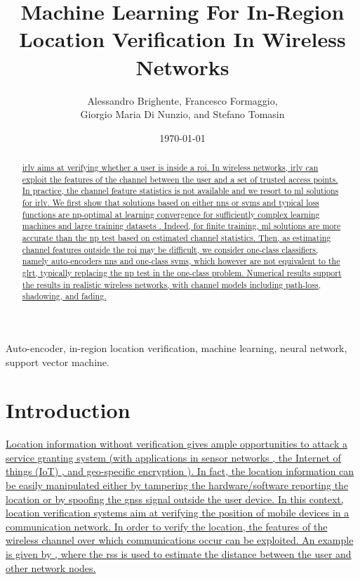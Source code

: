 \documentclass[final,twocolumn]{IEEEtran}
\title{Machine Learning For In-Region Location Verification In Wireless Networks}
\author{Alessandro Brighente, Francesco Formaggio,\\  Giorgio Maria Di Nunzio, and  Stefano Tomasin }
\date{\today}
\begin{document}
\maketitle

\sloppy

\begin{abstract}
\uline{\Ac{irlv} aims at verifying whether a user is inside a \ac{roi}. In wireless networks, \ac{irlv} can exploit the features of the channel between the user and a set of trusted access points. In practice, the channel feature statistics is not available and we resort to \ac{ml} solutions for \ac{irlv}. We first show that solutions based on either \acp{nn} or \acp{svm} and typical loss functions are \ac{np}-optimal at learning convergence for sufficiently complex learning machines and large training datasets . Indeed, for finite training, \ac{ml} solutions are more accurate than the \ac{np} test based on estimated channel statistics. Then, as estimating channel features outside the \ac{roi} may be difficult, we consider one-class classifiers, namely auto-encoders \acp{nn} and one-class \acp{svm}, which however are not equivalent to the \acf{glrt},  typically replacing the \ac{np} test in the one-class problem.  Numerical results support the results in realistic wireless networks, with channel models including path-loss, shadowing, and fading.}
\end{abstract}

\begin{IEEEkeywords}
Auto-encoder, in-region location verification, machine learning, neural network, support vector machine.
\end{IEEEkeywords}

\glsresetall
\section{Introduction}
\label{sec:intro}

\uline{Location information without verification gives ample opportunities to attack a service granting system (with  applications in sensor networks \mbox{\cite{Zeng-survey, 8376254, wei2013}}, the Internet of things (IoT) \cite{7903611}, and geo-specific encryption \cite{quaglia}). In fact, the location information can be easily manipulated either by tampering the hardware/software reporting the location or by spoofing the \ac{gnss} signal outside the user device. In this context, location verification systems aim at verifying the position of mobile devices in a communication network.  In order to verify the location, the features of the wireless channel over which communications occur can be exploited. An example is given by {\cite{li2010security}}, where the \ac{rss} is used to estimate the distance between the user and other network nodes.}
\end{document}
